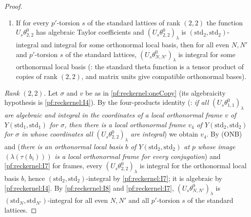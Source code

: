 \begin{proof}
\begin{enumerate}[label=(I\arabic*)]
  $F^{C,b}\prod\Phi_C^{-1}$ is integral for every model $C$), then it is $(L,L')$-integral
  (, from the unit substitution theorem
  : \emph{an orthonormal change of the coordinates
  $\sum_jM_{ij}\ell_C(Y_j)$ with $p$-integral unitary $M$ is realised by an integral substitution $Y\mapsto S(Y)$, and
  transforms $\prod\Phi_C^{-1}$ by an integral factor}); the same holds for local orthonormal frames
  ().
\item\label{pf:reckernel:I8} If for every $p'$-torsion $s$ of the standard lattices of rank $(2,2)$ the function
  $U_s\theta^0_{2,2}$ has algebraic Taylor coefficients and $(U_s\theta^0_{2,2})_\lambda$ is
  $(\mathrm{std}_2,\mathrm{std}_2)$-integral and integral for some orthonormal local basis, then for all
  even $N,N'$ and $p'$-torsion $s$ of the standard lattices, $(U_s\theta^0_{N,N'})_\lambda$ is integral for some orthonormal
  local basis (: the standard theta function is a tensor
  product of copies of rank $(2,2)$, and matrix units give compatible orthonormal bases).
\end{enumerate}

\emph{Rank $(2,2)$.} Let $\sigma$ and $v$ be as in \cref{pf:reckernel:oneCopy} (its algebraicity hypothesis is
\ref{pf:reckernel:I4}). By the four-products identity (:
\emph{if all $(U_s\theta^0_{1,1})_\lambda$ are algebraic and integral in the coordinates of a local orthonormal frame $v$ of
$Y(\mathrm{std}_1,\mathrm{std}_1)$ for $\sigma$, then there is a local orthonormal frame $v_4$ of
$Y(\mathrm{std}_2,\mathrm{std}_2)$ for $\sigma$ in whose coordinates all $(U_s\theta^0_{2,2})_\lambda$ are integral}) we obtain
$v_4$. By \textup{(ONB)} and  (\emph{there is an orthonormal local basis
$b$ of $Y(\mathrm{std}_2,\mathrm{std}_2)$ at $p$ whose image $(\lambda(\tau(b_i)))$ is a local orthonormal frame for every
conjugation}) and \ref{pf:reckernel:I7} for frames, every $(U_s\theta^0_{2,2})_\lambda$ is integral for the orthonormal local
basis $b$, hence $(\mathrm{std}_2,\mathrm{std}_2)$-integral by \ref{pf:reckernel:I7}; it is algebraic by \ref{pf:reckernel:I4}.
By \ref{pf:reckernel:I8} and \ref{pf:reckernel:I7}, $(U_s\theta^0_{N,N'})_\lambda$ is
$(\mathrm{std}_N,\mathrm{std}_{N'})$-integral for all even $N,N'$ and all $p'$-torsion $s$ of the standard lattices.


\end{proof}
